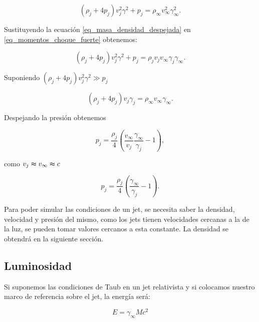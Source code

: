 \documentclass[12pt,a4paper]{book}
\begin{document}
\begin{equation} \label{eq_momentos_choque_fuerte}
  \left( \rho_j + 4p_j \right)v_j^2 \gamma^2 +p_j =  \rho_\infty  v_\infty^2 \gamma_{\infty}^{2}. 
\end{equation}

\noindent Sustituyendo la ecuación \ref{eq_masa_densidad_despejada} en \ref{eq_momentos_choque_fuerte} obtenemos:

\begin{equation}
  \left( \rho_j + 4p_j \right)v_j^2 \gamma^2 +p_j = \rho_j v_j v_\infty \gamma_j \gamma_\infty.
\end{equation}

\noindent Suponiendo $\left( \rho_j + 4p_j \right)v_j^2 \gamma^2 \gg p_j $



\begin{equation}
  \left( \rho_j + 4p_j \right)v_j \gamma_j = \rho_\infty v_\infty  \gamma_\infty.
\end{equation}

\noindent Despejando la presión obtenemos

\begin{equation}
  p_j = \frac{\rho_j}{4}\left(\frac{v_\infty}{v_j} \frac{\gamma_\infty}{\gamma_j}-1\right),
\end{equation}

\noindent como $v_j \thickapprox v_\infty \thickapprox c$

\begin{equation}
  p_j = \frac{\rho_j}{4}\left( \frac{\gamma_\infty}{\gamma_j}-1\right).
\end{equation}

Para poder simular las condiciones de un jet, se necesita saber la densidad, velocidad y presión del mismo, como los jets tienen velocidades cercanas a la
de la luz, se pueden tomar valores cercanos a esta constante. La densidad se obtendrá en la siguiente sección. 


\subsection{Luminosidad}
Si suponemos las condiciones de Taub en un jet relativista y si colocamos nuestro marco de referencia sobre el jet, la energía será:

\begin{equation} \label{eq._energia_relativista}
  E = \gamma_{\infty} M c^2
\end{equation}
\end{document}
